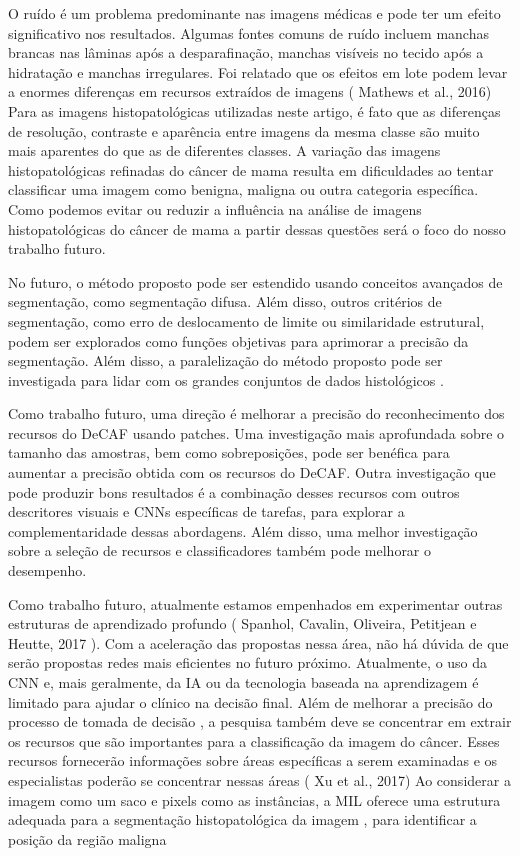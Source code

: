 \documentclass[preprint,12pt,authoryear]{elsarticle}
\begin{document}
O ruído é um problema predominante nas imagens médicas e pode ter um efeito significativo nos resultados. Algumas fontes comuns de ruído incluem manchas brancas nas lâminas após a desparafinação, manchas visíveis no tecido após a hidratação e manchas irregulares. Foi relatado que os efeitos em lote podem levar a enormes diferenças em recursos extraídos de imagens ( Mathews et al., 2016) Para as imagens histopatológicas utilizadas neste artigo, é fato que as diferenças de resolução, contraste e aparência entre imagens da mesma classe são muito mais aparentes do que as de diferentes classes. A variação das imagens histopatológicas refinadas do câncer de mama resulta em dificuldades ao tentar classificar uma imagem como benigna, maligna ou outra categoria específica. Como podemos evitar ou reduzir a influência na análise de imagens histopatológicas do câncer de mama a partir dessas questões será o foco do nosso trabalho futuro. \citep{XIE2019}

No futuro, o método proposto pode ser estendido usando conceitos avançados de segmentação, como segmentação difusa. Além disso, outros critérios de segmentação, como erro de deslocamento de limite ou similaridade estrutural, podem ser explorados como funções objetivas para aprimorar a precisão da segmentação. Além disso, a paralelização do método proposto pode ser investigada para lidar com os grandes conjuntos de dados histológicos . \citep{MITTAL2019}

Como trabalho futuro, uma direção é melhorar a precisão do reconhecimento dos recursos do DeCAF usando patches. Uma investigação mais aprofundada sobre o tamanho das amostras, bem como sobreposições, pode ser benéfica para aumentar a precisão obtida com os recursos do DeCAF. Outra investigação que pode produzir bons resultados é a combinação desses recursos com outros descritores visuais e CNNs específicas de tarefas, para explorar a complementaridade dessas abordagens. Além disso, uma melhor investigação sobre a seleção de recursos e classificadores também pode melhorar o desempenho. \citep{SPANHOL2017}

Como trabalho futuro, atualmente estamos empenhados em experimentar outras estruturas de aprendizado profundo ( Spanhol, Cavalin, Oliveira, Petitjean e Heutte, 2017 ). Com a aceleração das propostas nessa área, não há dúvida de que serão propostas redes mais eficientes no futuro próximo. Atualmente, o uso da CNN e, mais geralmente, da IA ​​ou da tecnologia baseada na aprendizagem é limitado para ajudar o clínico na decisão final. Além de melhorar a precisão do processo de tomada de decisão , a pesquisa também deve se concentrar em extrair os recursos que são importantes para a classificação da imagem do câncer. Esses recursos fornecerão informações sobre áreas específicas a serem examinadas e os especialistas poderão se concentrar nessas áreas ( Xu et al., 2017) Ao considerar a imagem como um saco e pixels como as instâncias, a MIL oferece uma estrutura adequada para a segmentação histopatológica da imagem , para identificar a posição da região maligna \citep{OLIVEIRA2018}
\end{document}
